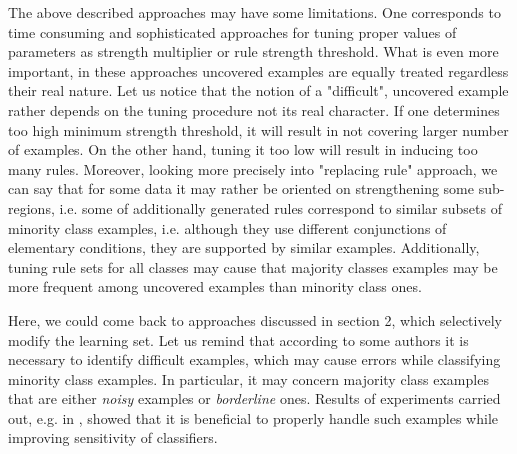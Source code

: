\documentclass{AIMeth05}
\begin{document}
The above described approaches may have some limitations. One corresponds to
time consuming and sophisticated approaches for tuning proper values of
parameters as strength multiplier or rule strength threshold. What is even
more important, in these approaches uncovered examples are equally treated
regardless their real nature. Let us notice that the notion of a
"difficult", uncovered example rather depends on the tuning procedure not
its real character. If one determines too high minimum strength threshold,
it will result in not covering larger number of examples. On the other hand,
tuning it too low will result in inducing too many rules. Moreover, looking
more precisely into "replacing rule" approach, we can say that for some data
it may rather be oriented on strengthening some sub-regions, i.e. some of
additionally generated rules correspond to similar subsets of minority class
examples, i.e. although they use different conjunctions of elementary
conditions, they are supported by similar examples. Additionally, tuning
rule sets for all classes may cause that majority classes examples may be
more frequent among uncovered examples than minority class ones.

Here, we could come back to  approaches discussed in section 2, which
selectively modify the learning set.  Let us remind that according to some
authors it is necessary to identify difficult examples, which may cause
errors while classifying minority class examples. In particular, it may
concern majority class examples that are either {\em noisy} examples  or
{\em borderline} ones. Results of experiments carried out, e.g. in
\cite{Batista,KubMat,Lav}, showed that it is beneficial to properly handle
such examples while improving sensitivity of classifiers.
\end{document}
